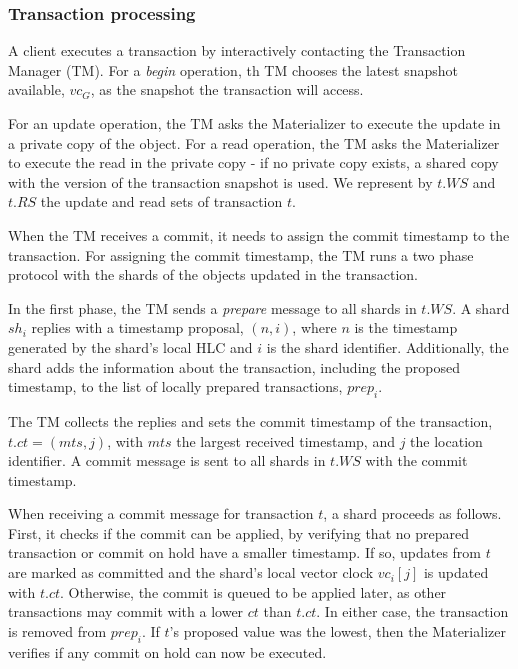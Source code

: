 \documentclass[sigplan,twocolumn,review,anonymous]{acmart}
\begin{document}
\subsubsection{Transaction processing}
A client executes a transaction by interactively contacting the 
Transaction Manager (TM).
%
For a \emph{begin} operation, th TM chooses the latest snapshot available,
$\mathit{vc}_G$, as the snapshot 
the transaction will access.

For an update operation, the TM asks the Materializer to execute the update in
a private copy of the object. For a read operation, 
the TM asks the Materializer to execute the read in the private copy - if no 
private copy exists, a shared copy with the version 
of the transaction snapshot is used. We represent by $t.WS$ and $t.RS$ the update 
and read sets of transaction $t$.

When the TM receives a commit, it needs to assign the commit timestamp to the transaction. 
For assigning the commit timestamp, the TM runs a two phase protocol with the shards of the objects
updated in the transaction. 


In the first phase,  the TM sends a \emph{prepare} message to all shards in $t.WS$.
A shard $\mathit{sh}_i$ replies with a timestamp proposal, $(n,i)$, where $n$ is the timestamp
generated by the shard's local HLC and $i$ is the shard identifier. Additionally, the shard adds the information
about the transaction, including the proposed timestamp, to the list of locally prepared transactions, $prep_i$.

The TM collects the replies and sets the commit timestamp of the transaction,  $t\!.\mathit{ct} = (\mathit{mts}, j)$,
with $\mathit{mts}$ the largest received timestamp, and $j$ the 
location identifier.
A commit message is sent to all shards in $t.WS$ with the commit timestamp.

When receiving a commit message for transaction $t$, a shard proceeds as follows.
First, it checks if the commit can be applied, by verifying that no prepared transaction or commit on hold have a 
smaller timestamp.
If so, updates from $t$ are marked as committed and the shard's local vector clock $\mathit{vc}_i[j]$ is 
updated with $t\!.\mathit{ct}$. 
Otherwise, the commit is queued to be applied later, as other transactions may commit with a lower
$\mathit{ct}$ than $t\!.\mathit{ct}$.
In either case,  the transaction is removed from $\mathit{prep}_i$. If $t$'s proposed value was the lowest, 
then the Materializer verifies if any commit on hold can now be executed.
\end{document}
